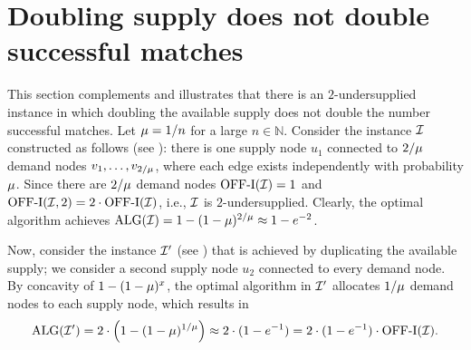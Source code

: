 \appendix
\section{Doubling supply does not double successful matches}
\label{sec: example_introduction}

This section complements 
 and illustrates that there is an $2$-undersupplied instance in which doubling the available supply does not double the number successful matches.
Let $\mu = 1/n$ for a large $n \in \mathbb{N}$. Consider the instance $\mathcal I$ constructed as follows (see ): there is one supply node $u_1$ connected to $2/\mu$ demand nodes $v_1, \ldots, v_{2/\mu}$, where each edge exists independently with probability $\mu$. Since there are $2/\mu$ demand nodes $\mathrm{\mathrm{OFF}}\textrm{-}\mathrm{I}(\mathcal I) = 1$ and $\mathrm{\mathrm{OFF}}\textrm{-}\mathrm{I}(\mathcal I, 2) = 2 \cdot \mathrm{\mathrm{OFF}}\textrm{-}\mathrm{I}(\mathcal I)$, i.e., $\mathcal I$ is $2$-undersupplied. Clearly, the optimal algorithm achieves $\text{ALG}(\mathcal I) = 1 - (1-\mu)^{2/\mu} \approx 1 - e^{-2}$.

Now, consider the instance $\mathcal I'$ (see ) that is achieved by duplicating the available supply; we consider a second supply node $u_2$ connected to every demand node. By concavity of $1-(1-\mu)^x$, the optimal algorithm in $\mathcal I'$ allocates $1/\mu$ demand nodes to each supply node, which results in $$\text{ALG}(\mathcal I') = 2 \cdot \left(1 - (1-\mu)^{1/\mu}\right) \approx 2 \cdot (1 - e^{-1}) = 2 \cdot (1 - e^{-1}) \cdot \mathrm{\mathrm{OFF}}\textrm{-}\mathrm{I}(\mathcal I).$$

